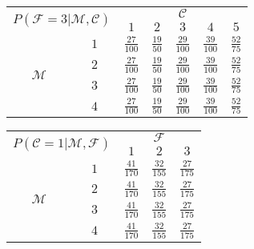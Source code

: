 \documentclass[preview]{standalone}
\newcommand{\M}{\mathcal{M}}
\newcommand{\F}{\mathcal{F}}
\newcommand{\C}{\mathcal{C}}
\begin{document}
	\vspace{1\mytextsize} \newline
	\begin{tabular}{|c|c|c|c|c|c|c|}
		\hline
		\multicolumn{2}{|c|}{\multirow{2}{*}{$P(\F = 3|\M,\C)$}} &                                 \multicolumn{5}{c|}{$\C$}                                  \\ \cline{3-7}
		\multicolumn{2}{|c|}{}                                   &       $1$        &       $2$       &       $3$        &       $4$        &       $5$       \\ \hline
		\multirow{4}{*}{$\M$} &               $1$                & $\frac{27}{100}$ & $\frac{19}{50}$ & $\frac{29}{100}$ & $\frac{39}{100}$ & $\frac{52}{75}$ \\ \cline{2-7}
		                      &               $2$                & $\frac{27}{100}$ & $\frac{19}{50}$ & $\frac{29}{100}$ & $\frac{39}{100}$ & $\frac{52}{75}$ \\ \cline{2-7}
		                      &               $3$                & $\frac{27}{100}$ & $\frac{19}{50}$ & $\frac{29}{100}$ & $\frac{39}{100}$ & $\frac{52}{75}$ \\ \cline{2-7}
		                      &               $4$                & $\frac{27}{100}$ & $\frac{19}{50}$ & $\frac{29}{100}$ & $\frac{39}{100}$ & $\frac{52}{75}$ \\ \hline
	\end{tabular}
	\hspace{0.5\mytextsize}
	\begin{tabular}{|c|c|c|c|c|}
		\hline
		\multicolumn{2}{|c|}{\multirow{2}{*}{$P(\C = 1|\M,\F)$}} &               \multicolumn{3}{c|}{$\F$}                \\ \cline{3-5}
		\multicolumn{2}{|c|}{}                                   &       $1$        &       $2$        &       $3$        \\ \hline
		\multirow{4}{*}{$\M$} &               $1$                & $\frac{41}{170}$ & $\frac{32}{155}$ & $\frac{27}{175}$ \\ \cline{2-5}
		                      &               $2$                & $\frac{41}{170}$ & $\frac{32}{155}$ & $\frac{27}{175}$ \\ \cline{2-5}
		                      &               $3$                & $\frac{41}{170}$ & $\frac{32}{155}$ & $\frac{27}{175}$ \\ \cline{2-5}
		                      &               $4$                & $\frac{41}{170}$ & $\frac{32}{155}$ & $\frac{27}{175}$ \\ \hline
	\end{tabular}
\end{document}
